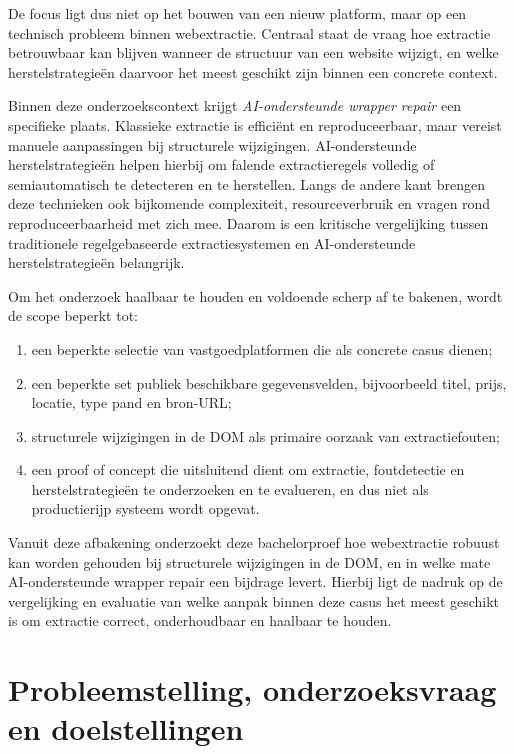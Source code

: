De focus ligt dus niet op het bouwen van een nieuw platform, maar op een technisch probleem binnen webextractie. Centraal staat de vraag hoe extractie betrouwbaar kan blijven wanneer de structuur van een website wijzigt, en welke herstelstrategieën daarvoor het meest geschikt zijn binnen een concrete context.

Binnen deze onderzoekscontext krijgt \textit{AI-ondersteunde wrapper repair} een specifieke plaats. Klassieke extractie is efficiënt en reproduceerbaar, maar vereist manuele aanpassingen bij structurele wijzigingen. AI-ondersteunde herstelstrategieën helpen hierbij om falende extractieregels volledig of semiautomatisch te detecteren en te herstellen. Langs de andere kant brengen deze technieken ook bijkomende complexiteit, resourceverbruik en vragen rond reproduceerbaarheid met zich mee. Daarom is een kritische vergelijking tussen traditionele regelgebaseerde extractiesystemen en AI-ondersteunde herstelstrategieën belangrijk.

Om het onderzoek haalbaar te houden en voldoende scherp af te bakenen, wordt de scope beperkt tot:
\begin{enumerate}
    \item een beperkte selectie van vastgoedplatformen die als concrete casus dienen;
    \item een beperkte set publiek beschikbare gegevensvelden, bijvoorbeeld titel, prijs, locatie, type pand en bron-URL;
    \item structurele wijzigingen in de DOM als primaire oorzaak van extractiefouten;
    \item een proof of concept die uitsluitend dient om extractie, foutdetectie en herstelstrategieën te onderzoeken en te evalueren, en dus niet als productierijp systeem wordt opgevat.
\end{enumerate}

Vanuit deze afbakening onderzoekt deze bachelorproef hoe webextractie robuust kan worden gehouden bij structurele wijzigingen in de DOM, en in welke mate AI-ondersteunde wrapper repair een bijdrage levert. Hierbij ligt de nadruk op de vergelijking en evaluatie van welke aanpak binnen deze casus het meest geschikt is om extractie correct, onderhoudbaar en haalbaar te houden.

\sloppy
\section{Probleemstelling, onderzoeksvraag en doelstellingen}
\label{sec:probleemstelling}


